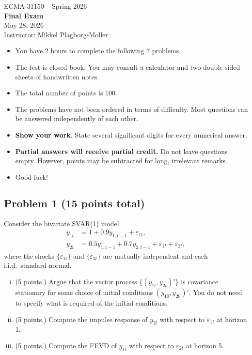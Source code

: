 \documentclass[12pt]{article}
\DeclareMathOperator*{\cov}{Cov}
\begin{document}
\begin{center}
{\large ECMA 31150 -- Spring 2026} \\[0.5\baselineskip]
{\Large \bf Final Exam} \\[0.3\baselineskip]
May 28, 2026 \\[0.3\baselineskip]
Instructor: Mikkel Plagborg-Moller
\end{center}

\bigskip

\begin{itemize}
\item You have 2 hours to complete the following 7 problems.
\item The test is closed-book. You may consult a calculator and two double-sided sheets of handwritten notes.
\item The total number of points is 100.
\item The problems have not been ordered in terms of difficulty. Most questions can be answered independently of each other.
\item \textbf{Show your work}. State several significant digits for every numerical answer.
\item \textbf{Partial answers will receive partial credit.} Do not leave questions empty. However, points may be subtracted for long, irrelevant remarks.
\item Good luck!
\end{itemize}

\clearpage

\subsection*{Problem 1 (15 points total)}
Consider the bivariate SVAR(1) model
\begin{align*}
y_{1t} &= 1 + 0.9 y_{1,t-1} + \varepsilon_{1t}, \\
y_{2t} &= 0.5y_{1,t-1} + 0.7 y_{2,t-1} + \varepsilon_{1t} + \varepsilon_{2t},
\end{align*}
where the shocks $\lbrace \varepsilon_{1t} \rbrace$ and $\lbrace \varepsilon_{2t} \rbrace$ are mutually independent and each i.i.d.\ standard normal.

\begin{enumerate}[i)]
\item (5 points.) Argue that the vector process $\lbrace (y_{1t},y_{2t})' \rbrace$ is covariance stationary for some choice of initial conditions $(y_{10},y_{20})'$. You do not need to specify what is required of the initial conditions.
\item (5 points.) Compute the impulse response of $y_{2t}$ with respect to $\varepsilon_{1t}$ at horizon 1.
\item (5 points.) Compute the FEVD of $y_{1t}$ with respect to $\varepsilon_{2t}$ at horizon 5.
\end{enumerate}
\end{document}
